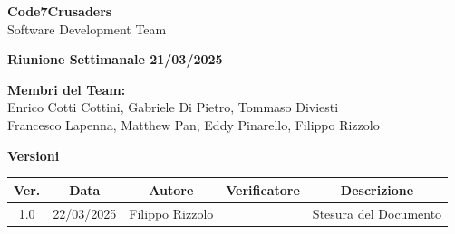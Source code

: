 \documentclass{article}
\begin{document}
\begin{titlepage}
    {\Huge \textbf{Code7Crusaders}}\\
    \vspace{0.5cm}
    {\Large Software Development Team}\\
    \vspace{2cm}
        
        {\large \textbf{Riunione Settimanale 21/03/2025}}\\
    \vspace{5cm}                           %
    
    
    \textbf{Membri del Team:}\\
    Enrico Cotti Cottini, Gabriele Di Pietro, Tommaso Diviesti \\
    Francesco Lapenna, Matthew Pan, Eddy Pinarello, Filippo Rizzolo \\
    \vspace{0.5cm}
    
    \vspace{1cm}
\end{titlepage}



\newpage
\begin{table}[h!]
\centering
\textbf{Versioni} \\ %
\vspace{2mm} %
\begin{tabular}{|c|c|c|c|c|}
    \hline
    \textbf{Ver.} & \textbf{Data} & \textbf{Autore} & \textbf{Verificatore} & \textbf{Descrizione} \\
    \hline
    1.0 & 22/03/2025 & Filippo Rizzolo &  & Stesura del Documento \\ 
    \hline                                  %
\end{tabular}
\end{table}
\vspace{3cm}
\newpage
\tableofcontents



\newpage
\end{document}
